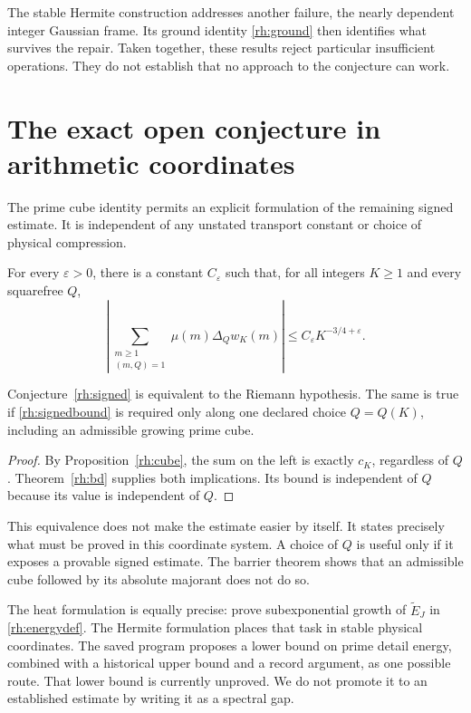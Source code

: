 The stable Hermite construction addresses another failure, the nearly dependent integer Gaussian frame. Its ground identity \eqref{rh:ground} then identifies what survives the repair. Taken together, these results reject particular insufficient operations. They do not establish that no approach to the conjecture can work.

\section{The exact open conjecture in arithmetic coordinates}

The prime cube identity permits an explicit formulation of the remaining signed estimate. It is independent of any unstated transport constant or choice of physical compression.

\begin{conjecture}\label{rh:signed}
For every \(\varepsilon>0\), there is a constant \(C_\varepsilon\) such that, for all integers \(K\ge1\) and every squarefree \(Q\),
\begin{equation}\label{rh:signedbound}
\left|\sum_{\substack{m\ge1\\(m,Q)=1}}
\mu(m)\Delta_Qw_K(m)\right|
\le C_\varepsilon K^{-3/4+\varepsilon}.
\end{equation}
\end{conjecture}

\begin{proposition}\label{rh:conditional}
Conjecture~\ref{rh:signed} is equivalent to the Riemann hypothesis. The same is true if \eqref{rh:signedbound} is required only along one declared choice \(Q=Q(K)\), including an admissible growing prime cube.
\end{proposition}

\begin{proof}
By Proposition~\ref{rh:cube}, the sum on the left is exactly \(c_K\), regardless of \(Q\). Theorem~\ref{rh:bd} supplies both implications. Its bound is independent of \(Q\) because its value is independent of \(Q\).
\end{proof}

This equivalence does not make the estimate easier by itself. It states precisely what must be proved in this coordinate system. A choice of \(Q\) is useful only if it exposes a provable signed estimate. The barrier theorem shows that an admissible cube followed by its absolute majorant does not do so.

The heat formulation is equally precise: prove subexponential growth of \(\widetilde E_J\) in \eqref{rh:energydef}. The Hermite formulation places that task in stable physical coordinates. The saved program proposes a lower bound on prime detail energy, combined with a historical upper bound and a record argument, as one possible route. That lower bound is currently unproved. We do not promote it to an established estimate by writing it as a spectral gap.

